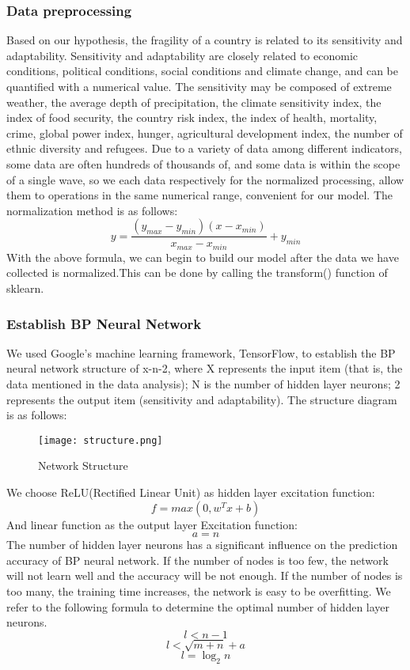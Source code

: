 \documentclass{mcmthesis}
\begin{document}
\subsubsection{Data preprocessing}
Based on our hypothesis, the fragility of a country is related to its 
sensitivity and adaptability. Sensitivity and adaptability are closely 
related to economic conditions, political conditions, social conditions and 
climate change, and can be quantified with a numerical value. The sensitivity 
may be composed of extreme weather, the average depth of precipitation, the 
climate sensitivity index, the index of food security, the country risk index, 
the index of health, mortality, crime, global power index, hunger, agricultural 
development index, the number of ethnic diversity and refugees. Due to a variety 
of data among different indicators, some data are often hundreds of thousands of, 
and some data is within the scope of a single wave, so we each data respectively 
for the normalized processing, allow them to operations in the same numerical range, 
convenient for our model. The normalization method is as follows:
\[ y=\frac{\left ( y_{max}-y_{min} \right )\left ( x-x_{min} \right )}{x_{max}-x_{min}}+y_{min} \]
With the above formula, we can begin to build our model after the data we have 
collected is normalized.This can be done by calling the transform() function 
of sklearn.
\subsubsection{Establish BP Neural Network}
We used Google's machine learning framework, TensorFlow, to establish the BP 
neural network structure of x-n-2, where X represents the input item (that is, 
the data mentioned in the data analysis); N is the number of hidden layer neurons; 2 
represents the output item (sensitivity and adaptability). The structure diagram is 
as follows:
\begin{figure}[h]
\small
\centering
\texttt{[image: structure.png]}
\caption{Network Structure} 
\label{fig:ns}
\end{figure}
We choose ReLU(Rectified Linear Unit) as hidden layer excitation function:
\[ f=max\left ( 0,w^{T}x+b \right ) \]
And linear function as the output layer Excitation function:
\[ a=n \]
The number of hidden layer neurons has a significant influence on 
the prediction accuracy of BP neural network. If the number of 
nodes is too few, the network will not learn well and the accuracy 
will be not enough. If the number of nodes is too many, the 
training time increases, the network is easy to be overfitting. 
We refer to the following formula to determine the optimal number 
of hidden layer neurons.
\[ l< n-1 \]
\[ l<\sqrt{m+n}+a \]
\[ l=\log_{2} n \]
\end{document}
